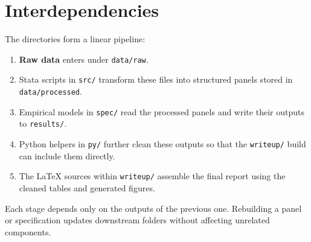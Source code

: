 \documentclass[11pt]{article}
\newcommand{\code}[1]{\texttt{#1}}
\begin{document}
\section{Interdependencies}

The directories form a linear pipeline:

\begin{enumerate}[label=\arabic*)]
  \item \textbf{Raw data} enters under \code{data/raw}.
  \item Stata scripts in \code{src/} transform these files into structured
        panels stored in \code{data/processed}.
  \item Empirical models in \code{spec/} read the processed panels and
        write their outputs to \code{results/}.
  \item Python helpers in \code{py/} further clean these outputs so that
        the \code{writeup/} build can include them directly.
  \item The \LaTeX{} sources within \code{writeup/} assemble the final
        report using the cleaned tables and generated figures.
\end{enumerate}

Each stage depends only on the outputs of the previous one. Rebuilding a
panel or specification updates downstream folders without affecting
unrelated components.
\end{document}

